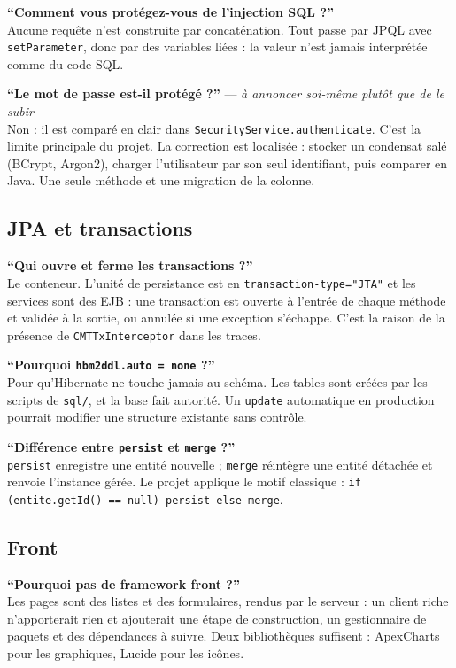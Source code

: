 \textbf{\enquote{Comment vous protégez-vous de l'injection SQL ?}}\\
Aucune requête n'est construite par concaténation. Tout passe par JPQL avec
\texttt{setParameter}, donc par des variables liées : la valeur n'est jamais
interprétée comme du code SQL.

\textbf{\enquote{Le mot de passe est-il protégé ?}} --- \emph{à annoncer
soi-même plutôt que de le subir}\\
Non : il est comparé en clair dans \texttt{SecurityService.authenticate}. C'est
la limite principale du projet. La correction est localisée : stocker un
condensat salé (BCrypt, Argon2), charger l'utilisateur par son seul
identifiant, puis comparer en Java. Une seule méthode et une migration de la
colonne.

\subsection{JPA et transactions}

\textbf{\enquote{Qui ouvre et ferme les transactions ?}}\\
Le conteneur. L'unité de persistance est en \texttt{transaction-type="JTA"} et
les services sont des EJB : une transaction est ouverte à l'entrée de chaque
méthode et validée à la sortie, ou annulée si une exception s'échappe. C'est
la raison de la présence de \texttt{CMTTxInterceptor} dans les traces.

\textbf{\enquote{Pourquoi \texttt{hbm2ddl.auto = none} ?}}\\
Pour qu'Hibernate ne touche jamais au schéma. Les tables sont créées par les
scripts de \texttt{sql/}, et la base fait autorité. Un \texttt{update}
automatique en production pourrait modifier une structure existante sans
contrôle.

\textbf{\enquote{Différence entre \texttt{persist} et \texttt{merge} ?}}\\
\texttt{persist} enregistre une entité nouvelle ; \texttt{merge} réintègre une
entité détachée et renvoie l'instance gérée. Le projet applique le motif
classique : \texttt{if (entite.getId() == null) persist else merge}.

\subsection{Front}

\textbf{\enquote{Pourquoi pas de framework front ?}}\\
Les pages sont des listes et des formulaires, rendus par le serveur : un
client riche n'apporterait rien et ajouterait une étape de construction, un
gestionnaire de paquets et des dépendances à suivre. Deux bibliothèques
suffisent : ApexCharts pour les graphiques, Lucide pour les icônes.

